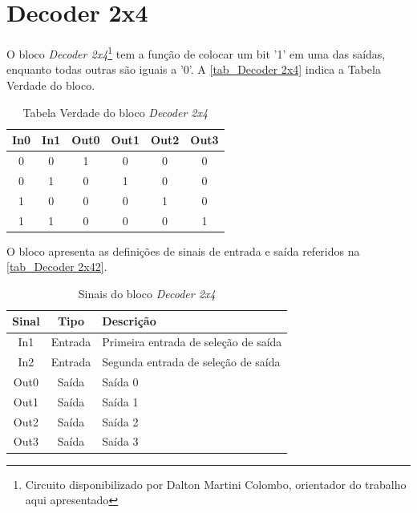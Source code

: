 \renewcommand{\NomeBloco}{\emph{Decoder 2x4}}
\renewcommand{\NomeBlocoNoIt}{Decoder 2x4}
\renewcommand{\NomePTab}{tab_\NomeBlocoNoIt}
\renewcommand{\NomeSTab}{tab_\NomeBlocoNoIt2}
\renewcommand{\NomePFig}{fig_\NomeBlocoNoIt}
\renewcommand{\NomeSFig}{fig_\NomeBlocoNoIt2}
\renewcommand{\NomeTTab}{tab_\NomeBlocoNoIt3}

\section{Decoder 2x4}

O bloco \NomeBloco{}\footnote{Circuito disponibilizado por Dalton Martini Colombo, orientador do trabalho aqui apresentado} tem a função de colocar um bit '1' em uma das sa\'idas, enquanto todas outras são iguais a '0'. A \autoref{\NomePTab} indica a Tabela Verdade do bloco.

\begin{table}[htbp]

\caption{Tabela Verdade do bloco \NomeBloco}%
\label{\NomePTab}
\centering
\begin{tabular}{cccccc}
    \toprule
    In0 & In1 & Out0 & Out1 & Out2 & Out3 \\
    \midrule \midrule
    0 & 0 & 1 & 0 & 0 & 0 \\
    \midrule
    0 & 1 & 0 & 1 & 0 & 0 \\
    \midrule
    1 & 0 & 0 & 0 & 1 & 0 \\
    \midrule
    1 & 1 & 0 & 0 & 0 & 1 \\
\bottomrule

\end{tabular}
\end{table}

O bloco apresenta as definições de sinais de entrada e sa\'ida referidos na \autoref{\NomeSTab}.

\begin{table}[htbp]
\caption{Sinais do bloco \NomeBloco}
\label{\NomeSTab}
\centering
\begin{tabular}{ccl}

    \toprule
    Sinal & Tipo    & Descrição        \\
    \midrule \midrule
    In1    & Entrada & Primeira entrada de seleção de sa\'ida \\
    \midrule
    In2    & Entrada & Segunda entrada de seleção de sa\'ida \\
    \midrule
    Out0 & Sa\'ida & Sa\'ida 0\\
    \midrule
    Out1 & Sa\'ida & Sa\'ida 1\\
    \midrule
    Out2 & Sa\'ida & Sa\'ida 2\\
    \midrule
    Out3 & Sa\'ida & Sa\'ida 3\\
    \bottomrule
\end{tabular}
\end{table}

